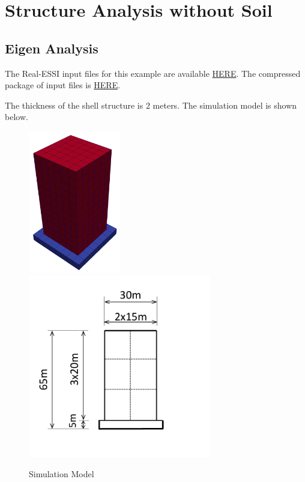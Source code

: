\section{Structure Analysis without Soil}
\label{structure_only_3D}

\subsection{Eigen Analysis}

The Real-ESSI input files for this example are available 
\href{https://github.com/yuan-energy/Real-ESSI-Short-Course-Examples/tree/master/short-course-examples/nonlinear_analysis_steps/structure/eigen}{HERE}. 
The compressed package of input files is  
\href{https://github.com/yuan-energy/Real-ESSI-Short-Course-Examples/tree/master/short-course-examples/nonlinear_analysis_steps/structure/eigen/eigen.tgz?raw=true}{HERE}. 



The thickness of the shell structure is 2 meters.
The simulation model is shown below.
\begin{figure}[H]
  \centering
  \includegraphics[width = 4cm]{./Figure-files/nonlinear_analysis_steps/structure/eigen/structure-only.png}
  \hspace{2cm}
  \includegraphics[width = 8cm]{./Figure-files/nonlinear_analysis_steps/structure/eigen/structure_geometry.pdf}
  \caption{Simulation Model}
  \label{fig_simulate_model}
\end{figure}


